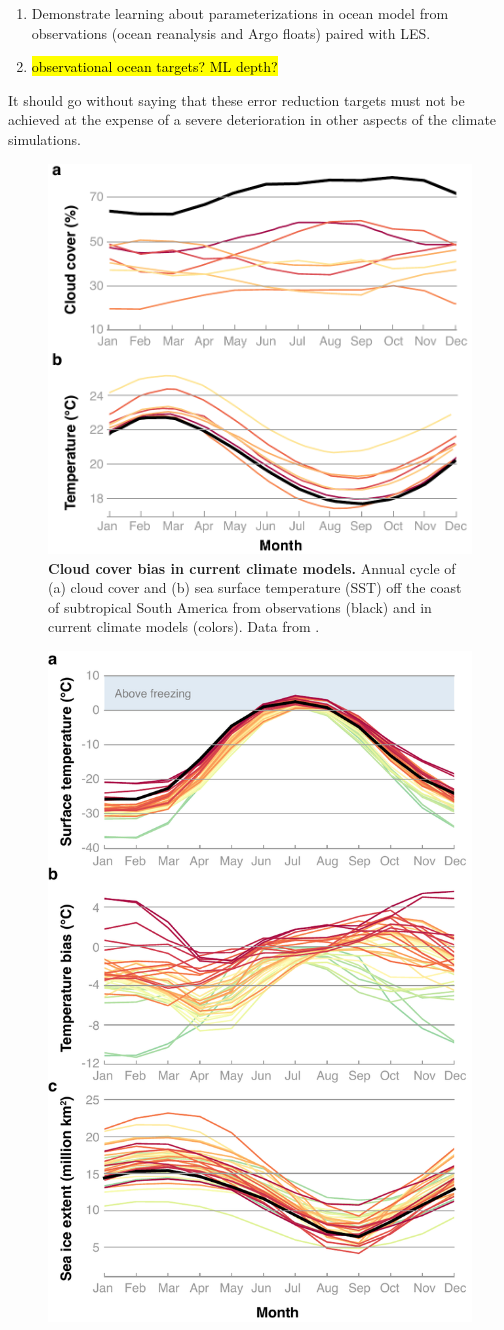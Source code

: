\documentclass{article}
\begin{document}
\begin{enumerate}
\begin{enumerate}
        \item Demonstrate learning about parameterizations in ocean model from observations (ocean reanalysis and Argo floats) paired with LES.
        \item \hl{observational ocean targets? ML depth?}
    \end{enumerate}
      It should go without saying that these error reduction targets must not be achieved at the expense of a severe deterioration in other aspects of the climate simulations. 
         \begin{figure}[htb]
     \centerline{\includegraphics[width=.6\textwidth]{Lin-Sc-bias.pdf}}
      \caption{\textbf{Cloud cover bias in current climate models.} Annual cycle of (a) cloud cover and (b) sea surface temperature (SST) off the coast of subtropical South America from observations (black) and in current climate models (colors). Data from \protect\citet{Lin14b}.}\label{f:Sc-bias}
    \end{figure}
        \begin{figure}[htb]
      \centerline{\includegraphics[width=.6\textwidth]{CMIP5-Arctic}}

\end{figure}
\end{enumerate}
\end{document}
